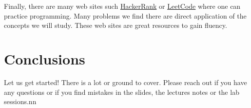 \documentclass{aldast}
\begin{document}
Finally, there are many web sites such
\href{http://www.hackerrank.com}{HackerRank} or
\href{https://leetcode.com}{LeetCode} where one can practice
programming. Many problems we find there are direct application of the
concepts we will study. These web sites are great resources to gain
fluency.


\section*{Conclusions}
Let us get started! There is a lot or ground to cover. Please reach
out if you have any questions or if you find mistakes in the slides,
the lectures notes or the lab sessions.nn



\end{document}
